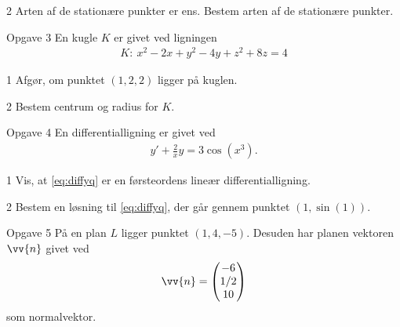 	\begin{delopgave}{}{2}
		Arten af de stationære punkter er ens. Bestem arten af de stationære punkter. 
	\end{delopgave}
\begin{opgavetekst}{Opgave 3}
	En kugle $K$ er givet ved ligningen
	\begin{align*}
		K: \ x^2-2x+y^2-4y+z^2+8z=4
	\end{align*}
\end{opgavetekst}
\begin{delopgave}{}{1}
	Afgør, om punktet $(1,2,2)$ ligger på kuglen.
\end{delopgave}
\begin{delopgave}{}{2}
	Bestem centrum og radius for $K$.
\end{delopgave}
\begin{opgavetekst}{Opgave 4 }
	En differentialligning er givet ved 
	\begin{align}\label{eq:diffyq}
		y' + \frac{2}{x}y = 3\cos(x^3).
	\end{align}
\end{opgavetekst}
\begin{delopgave}{}{1}
	Vis, at \eqref{eq:diffyq} er en førsteordens lineær differentialligning.
\end{delopgave}
\begin{delopgave}{}{2}
	Bestem en løsning til \eqref{eq:diffyq}, der går gennem punktet $(1,\sin(1))$.
\end{delopgave}
\begin{opgavetekst}{Opgave 5}
	På en plan $L$ ligger punktet $(1,4,-5)$. Desuden har planen vektoren $\vv{n}$ givet ved
	\begin{align*}
		\vv{n} = 
		\begin{pmatrix}
			-6 \\ 1/2 \\ 10
		\end{pmatrix}
	\end{align*}
	som normalvektor.
\end{opgavetekst}

